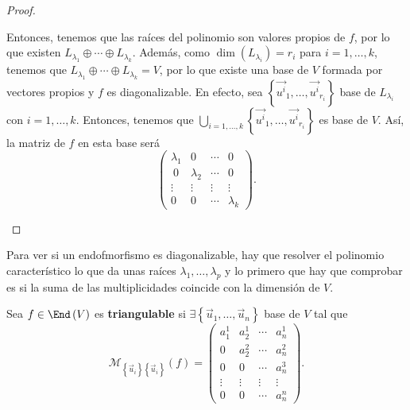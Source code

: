 \begin{proof}
\begin{description}
	Entonces, tenemos que las raíces del polinomio son valores propios de $\displaystyle f $, por lo que existen $\displaystyle L_{\lambda_{1}} \oplus \cdots \oplus L_{\lambda_{k}} $. Además, como $\displaystyle \dim\left(L_{\lambda_{i}}\right) = r_{i} $ para $\displaystyle i = 1, \ldots, k $, tenemos que $\displaystyle L_{\lambda_{1}}\oplus\cdots\oplus L_{\lambda_{k}} = V $, por lo que existe una base de $\displaystyle V $ formada por vectores propios y $\displaystyle f $ es diagonalizable. En efecto, sea $\displaystyle \left\{ \vec{u^{i}}_{1}, \ldots, \vec{u^{i}}_{r_{i}}\right\}  $ base de $\displaystyle L_{\lambda_{i}} $ con $\displaystyle i = 1, \ldots, k $. Entonces, tenemos que $\displaystyle \bigcup_{i = 1, \ldots, k} \left\{ \vec{u^{i}}_{1}, \ldots, \vec{u^{i}}_{r_{i}}\right\}  $ es base de $\displaystyle V $. Así, la matriz de $\displaystyle f $ en esta base será
\[ \begin{pmatrix} \lambda_{1} & 0 & \cdots & 0 \\\
0 & \lambda_{2} & \cdots & 0 \\
 \vdots & \vdots & \vdots & \vdots \\
0 & 0 & \cdots & \lambda_{k}\end{pmatrix}.\]
\end{description}
\end{proof}
\begin{observation}
\normalfont Para ver si un endofmorfismo es diagonalizable, hay que resolver el polinomio característico lo que da unas raíces $\displaystyle \lambda_{1}, \ldots, \lambda_{p} $ y lo primero que hay que comprobar es si la suma de las multiplicidades coincide con la dimensión de $\displaystyle V $.
\end{observation}
\begin{fdefinition}[]
	\normalfont Sea $\displaystyle f \in \End\left(V\right) $ es \textbf{triangulable} si $\displaystyle \exists \left\{ \vec{u}_{1}, \ldots, \vec{u}_{n}\right\}  $ base de $\displaystyle V $ tal que 
	\[\mathcal{M}_{ \left\{ \vec{u}_{i}\right\} \left\{ \vec{u}_{i}\right\} }\left(f\right) =  \begin{pmatrix} a^{1}_{1} & a^{1}_{2} & \cdots & a^{1}_{n} \\
		0 & a^{2}_{2} & \cdots & a^{2}_{n} \\
0 & 0 & \cdots & a^{3}_{n} \\
\vdots & \vdots & \vdots & \vdots \\
0 & 0 & \cdots & a^{n}_{n}\end{pmatrix} .\]
\end{fdefinition}
